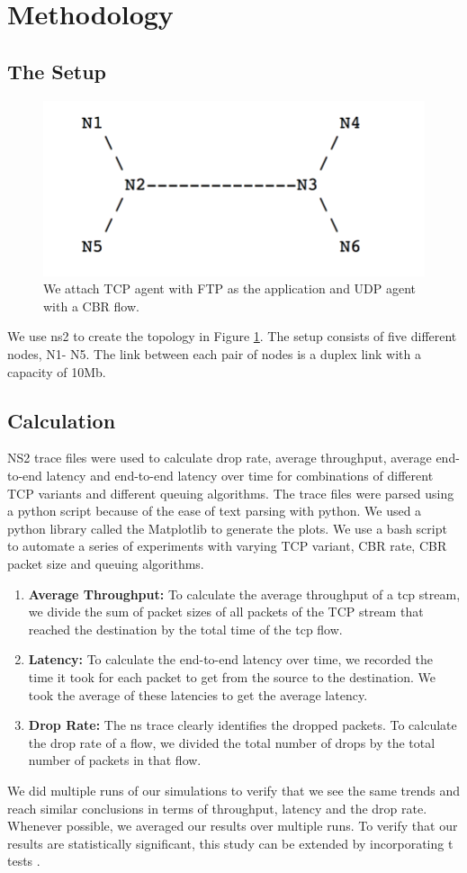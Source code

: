  \section{Methodology}\label{sec:methodology}
 \subsection{The Setup}
  \begin{figure}[!htbp]
  	\centering 
	\includegraphics[scale=0.4]{setup.png}
	\caption{We attach TCP agent with FTP as the application and UDP agent with a CBR flow.}
	\label{fig:setup}
\end{figure}
We use ns2 to create the topology in Figure \ref{fig:setup}. The setup consists of five different nodes, N1- N5. The link between each pair of nodes is a duplex link with a capacity of 10Mb.
\subsection{Calculation}
NS2 trace files were used to calculate drop rate, average throughput, average end-to-end latency and end-to-end latency over time for combinations of different TCP variants and different queuing algorithms. The trace files were parsed using a python script because of the ease of text parsing with python. We used a python library called the Matplotlib to generate the plots. We use a bash script to automate a series of experiments with varying TCP variant, CBR rate, CBR packet size and queuing algorithms. 
\begin{enumerate}
\item \textbf{Average Throughput:} To calculate the average throughput of a tcp stream, we divide the sum of packet sizes of all packets of the TCP stream that reached the destination by the total time of the tcp flow. 
\item \textbf{Latency:} To calculate the end-to-end latency over time, we recorded the time it took for each packet to get from the source to the destination. We took the average of these latencies to get the average latency. 
\item \textbf{Drop Rate:} The ns trace clearly identifies the dropped packets. To calculate the drop rate of a flow, we divided the total number of drops by the total number of packets in that flow.
\end{enumerate}
We did multiple runs of our simulations to verify that we see the same trends and reach similar conclusions in terms of throughput, latency and the drop rate. Whenever possible, we averaged our results over multiple runs. To verify that our results are statistically significant, this study can be extended by incorporating t tests . 
